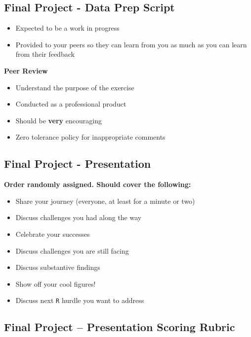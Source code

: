 \documentclass[
  letterpaper,
  DIV=11,
  numbers=noendperiod,
  oneside]{scrartcl}
\providecommand{\tightlist}{%
  \setlength{\itemsep}{0pt}\setlength{\parskip}{0pt}}\usepackage{longtable,booktabs,array}
\begin{document}
\hypertarget{final-project---data-prep-script}{%
\subsection{Final Project - Data Prep
Script}\label{final-project---data-prep-script}}

\begin{itemize}
\tightlist
\item
  Expected to be a work in progress
\item
  Provided to your peers so they can learn from you as much as you can
  learn from their feedback
\end{itemize}

\textbf{Peer Review}

\begin{itemize}
\tightlist
\item
  Understand the purpose of the exercise
\item
  Conducted as a professional product
\item
  Should be \textbf{very} encouraging
\item
  Zero tolerance policy for inappropriate comments
\end{itemize}

\hypertarget{final-project---presentation}{%
\subsection{Final Project -
Presentation}\label{final-project---presentation}}

\textbf{Order randomly assigned. Should cover the following:}

\begin{itemize}
\tightlist
\item
  Share your journey (everyone, at least for a minute or two)
\item
  Discuss challenges you had along the way
\item
  Celebrate your successes
\item
  Discuss challenges you are still facing
\item
  Discuss substantive findings
\item
  Show off your cool figures!
\item
  Discuss next \texttt{R} hurdle you want to address
\end{itemize}

\hypertarget{final-project-presentation-scoring-rubric}{%
\subsection{Final Project -- Presentation Scoring
Rubric}\label{final-project-presentation-scoring-rubric}}
\end{document}
